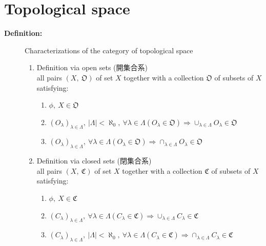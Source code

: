\documentclass[english,dvipdfmx]{jsarticle}
\begin{document}
\section{Topological space}
\begin{description}
    \item[\bf{Definition:}] Characterizations of the category of topological space
        \begin{enumerate}
            \renewcommand{\labelenumi}{(\Roman{enumi}).}
            \item Definition via open sets (開集合系) \\
                all pairs $( X,\ \mathfrak{O})$ of set $X$ together with a collection $\mathfrak{O}$ of subsets of $X$ satisfying:
                \begin{enumerate}
                    \renewcommand{\labelenumii}{\arabic{enumii}.}
                    \item $\phi,\ X \in \mathfrak{O}$
                    \item $ (O_{\lambda})_{\lambda \in \Lambda},\ |\Lambda| < \aleph_0,\ \forall \lambda \in \Lambda ( O_{\lambda} \in \mathfrak{O} ) \Rightarrow \cup_{\lambda \in \Lambda} O_{\lambda}  \in \mathfrak{O}$
                    \item $ (O_{\lambda})_{\lambda \in \Lambda},\ \forall \lambda \in \Lambda ( O_{\lambda} \in \mathfrak{O} ) \Rightarrow \cap_{\lambda \in \Lambda} O_{\lambda}  \in \mathfrak{O}$
                \end{enumerate}

            \item Definition via closed sets (閉集合系) \\
                all pairs $( X,\ \mathfrak{C})$ of set $X$ together with a collection $\mathfrak{C}$ of subsets of $X$ satisfying:
                \begin{enumerate}
                    \renewcommand{\labelenumii}{\arabic{enumii}.}
                    \item $\phi,\ X \in \mathfrak{C}$
                    \item $ (C_{\lambda})_{\lambda \in \Lambda},\ \forall \lambda \in \Lambda ( C_{\lambda} \in \mathfrak{C} ) \Rightarrow \cup_{\lambda \in \Lambda} C_{\lambda}  \in \mathfrak{C}$
                    \item $ (C_{\lambda})_{\lambda \in \Lambda},\ |\Lambda| < \aleph_0,\ \forall \lambda \in \Lambda ( C_{\lambda} \in \mathfrak{C} ) \Rightarrow \cap_{\lambda \in \Lambda} C_{\lambda}  \in \mathfrak{C}$
                \end{enumerate}


\end{enumerate}
\end{description}
\end{document}
